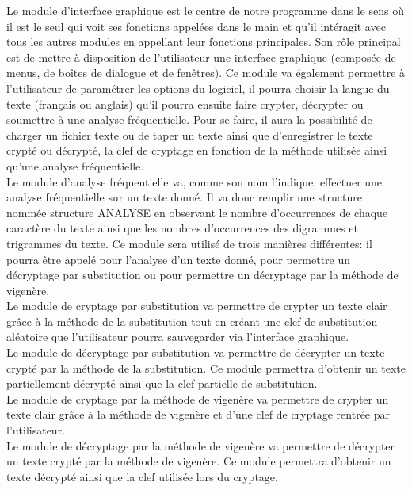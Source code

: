 \documentclass[a4]{article}
\begin{document}
	Le module d'interface graphique est le centre de notre programme dans le sens où il est le seul qui voit ses 
	fonctions appelées dans le main et qu'il intéragit avec tous les autres modules en appellant leur fonctions principales.
	Son rôle principal est de mettre à disposition de l'utilisateur une interface graphique 
	(composée de menus, de boîtes de dialogue et de fenêtres). Ce module va également permettre à l'utilisateur de
	 paramétrer les options du logiciel, il pourra choisir la langue du texte (français ou anglais) qu'il
	 pourra ensuite faire crypter, décrypter ou soumettre à une analyse fréquentielle. Pour se faire, il aura
	 la possibilité de charger un fichier texte ou de taper un texte ainsi que d'enregistrer le texte crypté 
	 ou décrypté, la clef de cryptage en fonction de la méthode utilisée ainsi qu'une analyse fréquentielle. \\
	
	 Le module d'analyse fréquentielle va, comme son nom l'indique, effectuer une analyse fréquentielle sur un texte donné.
	 Il va donc remplir une structure nommée structure ANALYSE en observant le nombre d'occurrences de chaque caractère du 
	 texte ainsi que les nombres d'occurrences des digrammes et trigrammes du texte.
	 Ce module sera utilisé de trois manières différentes: il pourra être appelé pour l'analyse d'un texte donné,
	 pour permettre un décryptage par substitution ou pour permettre un décryptage par la méthode de vigenère. \\

	 Le module de cryptage par substitution va permettre de crypter un texte clair grâce à la méthode de la substitution
	 tout en créant une clef de substitution aléatoire que l'utilisateur pourra sauvegarder via l'interface graphique. \\
	
	 Le module de décryptage par substitution va permettre de décrypter un texte crypté par la méthode de la substitution.
	 Ce module permettra d'obtenir un texte partiellement décrypté ainsi que la clef partielle de substitution. \\

 	 Le module de cryptage par la méthode de vigenère va permettre de crypter un texte clair grâce à la méthode de vigenère
	 et d'une clef de cryptage rentrée par l'utilisateur. \\

	 Le module de décryptage par la méthode de vigenère va permettre de décrypter un texte crypté par la méthode de vigenère. 
	 Ce module permettra d'obtenir un texte décrypté ainsi que la clef utilisée lors du cryptage. \\ \\
\end{document}
